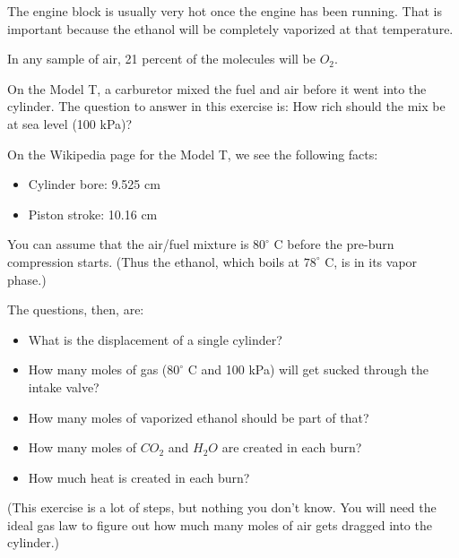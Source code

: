 The engine block is usually very hot once the engine has been running.  That is important because the ethanol will be completely vaporized at that temperature.

In any sample of air,  21 percent of the molecules will be $O_2$.

\begin{Exercise}[title={Fuel Mix for the Model T},  label=fuelmix]

On the Model T, a carburetor mixed the fuel and air before it went into the cylinder.   The question to answer in this exercise is: How rich should the mix be at sea level (100 kPa)?

On the Wikipedia page for the Model T,  we see the following facts:
\begin{itemize}
\item Cylinder bore: 9.525 cm
\item Piston stroke: 10.16 cm
\end{itemize}

You can assume that the air/fuel mixture is $80^\circ$ C before the pre-burn compression starts.  (Thus the ethanol,  which boils at $78^\circ$ C, is in its vapor phase.)

The questions, then, are:

\begin{itemize}
\item What is the displacement of a single cylinder?
\item How many moles of gas ($80^\circ$ C and 100 kPa) will get sucked through the intake valve?
\item How many moles of vaporized ethanol should be part of that?
\item How many moles of $CO_2$  and  $H_2O$ are created in each burn?
\item How much heat is created in each burn?
\end{itemize}

(This exercise is a lot of steps, but nothing you don't know.  You will need the ideal gas law to figure out how much many moles of air gets dragged into the cylinder.)

\end{Exercise}

